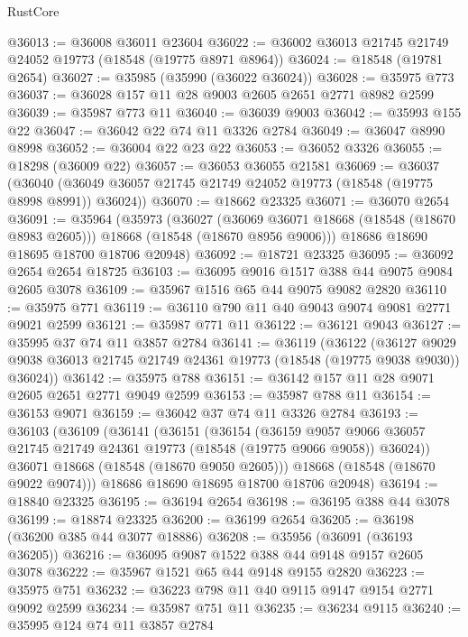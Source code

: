 \begin{lexlean}{RustCore}
\begin{coremodule}
@36013 := @36008 @36011 @23604
@36022 := @36002 @36013 @21745 @21749 @24052 @19773 (@18548 (@19775 @8971 @8964))
@36024 := @18548 (@19781 @2654)
@36027 := @35985 (@35990 (@36022 @36024))
@36028 := @35975 @773
@36037 := @36028 @157 @11 @28 @9003 @2605 @2651 @2771 @8982 @2599
@36039 := @35987 @773 @11
@36040 := @36039 @9003
@36042 := @35993 @155 @22
@36047 := @36042 @22 @74 @11 @3326 @2784
@36049 := @36047 @8990 @8998
@36052 := @36004 @22 @23 @22
@36053 := @36052 @3326
@36055 := @18298 (@36009 @22)
@36057 := @36053 @36055 @21581
@36069 := @36037
    (@36040 (@36049 @36057 @21745 @21749 @24052 @19773 (@18548 (@19775 @8998 @8991)) @36024))
@36070 := @18662 @23325
@36071 := @36070 @2654
@36091 := @35964
    (@35973
      (@36027
        (@36069 @36071 @18668 (@18548 (@18670 @8983 @2605)))
        @18668
        (@18548 (@18670 @8956 @9006)))
      @18686
      @18690
      @18695
      @18700
      @18706
      @20948)
@36092 := @18721 @23325
@36095 := @36092 @2654 @2654 @18725
@36103 := @36095 @9016 @1517 @388 @44 @9075 @9084 @2605 @3078
@36109 := @35967 @1516 @65 @44 @9075 @9082 @2820
@36110 := @35975 @771
@36119 := @36110 @790 @11 @40 @9043 @9074 @9081 @2771 @9021 @2599
@36121 := @35987 @771 @11
@36122 := @36121 @9043
@36127 := @35995 @37 @74 @11 @3857 @2784
@36141 := @36119
    (@36122
      (@36127 @9029 @9038 @36013 @21745 @21749 @24361 @19773 (@18548 (@19775 @9038 @9030)) @36024))
@36142 := @35975 @788
@36151 := @36142 @157 @11 @28 @9071 @2605 @2651 @2771 @9049 @2599
@36153 := @35987 @788 @11
@36154 := @36153 @9071
@36159 := @36042 @37 @74 @11 @3326 @2784
@36193 := @36103
    (@36109
      (@36141
        (@36151
          (@36154
            (@36159
              @9057
              @9066
              @36057
              @21745
              @21749
              @24361
              @19773
              (@18548 (@19775 @9066 @9058))
              @36024))
          @36071
          @18668
          (@18548 (@18670 @9050 @2605)))
        @18668
        (@18548 (@18670 @9022 @9074)))
      @18686
      @18690
      @18695
      @18700
      @18706
      @20948)
@36194 := @18840 @23325
@36195 := @36194 @2654
@36198 := @36195 @388 @44 @3078
@36199 := @18874 @23325
@36200 := @36199 @2654
@36205 := @36198 (@36200 @385 @44 @3077 @18886)
@36208 := @35956 (@36091 (@36193 @36205))
@36216 := @36095 @9087 @1522 @388 @44 @9148 @9157 @2605 @3078
@36222 := @35967 @1521 @65 @44 @9148 @9155 @2820
@36223 := @35975 @751
@36232 := @36223 @798 @11 @40 @9115 @9147 @9154 @2771 @9092 @2599
@36234 := @35987 @751 @11
@36235 := @36234 @9115
@36240 := @35995 @124 @74 @11 @3857 @2784

\end{coremodule}
\end{lexlean}
